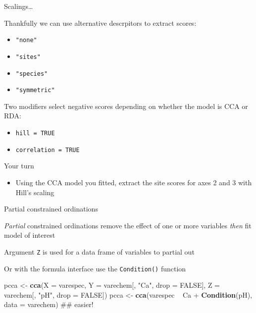 \documentclass[10pt,ignorenonframetext,compress, aspectratio=169]{beamer}
\newenvironment{Shaded}{\begin{snugshade}}{\end{snugshade}}
\newcommand{\KeywordTok}[1]{\textcolor[rgb]{0.13,0.29,0.53}{\textbf{{#1}}}}
\newcommand{\DataTypeTok}[1]{\textcolor[rgb]{0.13,0.29,0.53}{{#1}}}
\newcommand{\StringTok}[1]{\textcolor[rgb]{0.31,0.60,0.02}{{#1}}}
\newcommand{\OtherTok}[1]{\textcolor[rgb]{0.56,0.35,0.01}{{#1}}}
\newcommand{\NormalTok}[1]{{#1}}
\begin{document}
\begin{frame}{Scalings\ldots{}}

Thankfully we can use alternative descrpitors to extract scores:

\begin{itemize}
\itemsep1pt\parskip0pt
\item
  \texttt{"none"}
\item
  \texttt{"sites"}
\item
  \texttt{"species"}
\item
  \texttt{"symmetric"}
\end{itemize}

Two modifiers select negative scores depending on whether the model is
CCA or RDA:

\begin{itemize}
\itemsep1pt\parskip0pt
\item
  \texttt{hill\ =\ TRUE}
\item
  \texttt{correlation\ =\ TRUE}
\end{itemize}

\end{frame}

\begin{frame}{Your turn}

\begin{itemize}
\itemsep1pt\parskip0pt
\item
  Using the CCA model you fitted, extract the site scores for axes 2 and
  3 with Hill's scaling
\end{itemize}

\end{frame}

\begin{frame}[fragile]{Partial constrained ordinations}

\emph{Partial} constrained ordinations remove the effect of one or more
variables \emph{then} fit model of interest

Argument \texttt{Z} is used for a data frame of variables to partial out

Or with the formula interface use the \texttt{Condition()} function

\scriptsize

\begin{Shaded}
\begin{Highlighting}[]
\NormalTok{pcca <-}\StringTok{ }\KeywordTok{cca}\NormalTok{(}\DataTypeTok{X =} \NormalTok{varespec,}
            \DataTypeTok{Y =} \NormalTok{varechem[, }\StringTok{"Ca"}\NormalTok{, }\DataTypeTok{drop =} \OtherTok{FALSE}\NormalTok{],}
            \DataTypeTok{Z =} \NormalTok{varechem[, }\StringTok{"pH"}\NormalTok{, }\DataTypeTok{drop =} \OtherTok{FALSE}\NormalTok{])}
\NormalTok{pcca <-}\StringTok{ }\KeywordTok{cca}\NormalTok{(varespec ~}\StringTok{ }\NormalTok{Ca +}\StringTok{ }\KeywordTok{Condition}\NormalTok{(pH), }\DataTypeTok{data =} \NormalTok{varechem) ## easier!}
\end{Highlighting}
\end{Shaded}

\normalsize

\end{frame}
\end{document}
